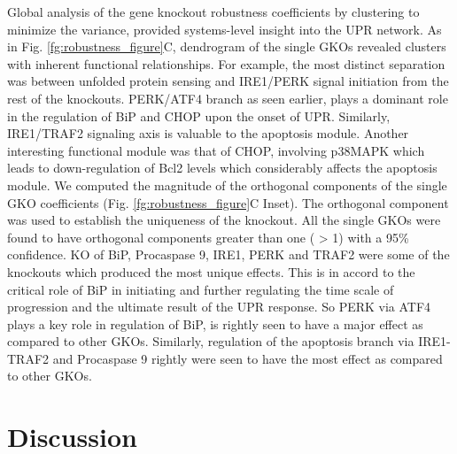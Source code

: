 \documentclass[fleqn,10pt]{wlscirep}
\begin{document}
Global analysis of the gene knockout robustness coefficients by clustering to minimize the variance, provided systems-level insight into the UPR network. As in Fig. \ref{fg:robustness_figure}C, dendrogram of the single GKOs revealed clusters with inherent functional relationships. For example, the most distinct separation was between unfolded protein sensing and IRE1/PERK signal initiation from the rest of the knockouts. PERK/ATF4 branch as seen earlier, plays a dominant role in the regulation of BiP and CHOP upon the onset of UPR. Similarly, IRE1/TRAF2 signaling axis is valuable to the apoptosis module. Another interesting functional module was that of CHOP, involving p38MAPK which leads to down-regulation of Bcl2 levels which considerably affects the apoptosis module. We computed the magnitude of the orthogonal components of the single GKO coefficients (Fig. \ref{fg:robustness_figure}C Inset). The orthogonal component was used to establish the uniqueness of the knockout. All the single GKOs were found to have orthogonal components greater than one ( > 1) with a 95\% confidence. KO of BiP, Procaspase 9, IRE1, PERK and TRAF2 were some of the knockouts which produced the most unique effects. This is in accord to the critical role of BiP in initiating and further regulating the time scale of progression and the ultimate result of the UPR response. So PERK via ATF4 plays a key role in regulation of BiP, is rightly seen to have a major effect as compared to other GKOs. Similarly, regulation of the apoptosis branch via IRE1-TRAF2 and Procaspase 9 rightly were seen to have the most effect as compared to other GKOs. 


\section*{Discussion}
\end{document}
